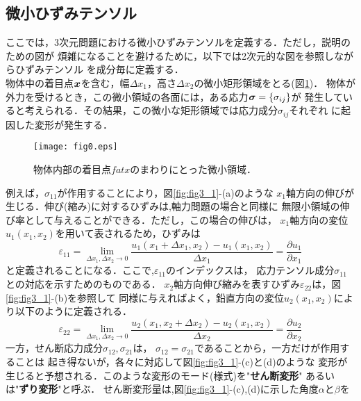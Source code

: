 \documentclass[10pt,a4j]{jarticle}
\begin{document}
\subsection{微小ひずみテンソル}
ここでは，3次元問題における微小ひずみテンソルを定義する．ただし，説明のための図が
煩雑になることを避けるために，以下では2次元的な図を参照しながらひずみテンソル
を成分毎に定義する．\\

物体中の着目点$\mbox{\boldmath $x$}$を含む，幅$\Delta x_1$，高さ$\Delta x_2$の微小矩形領域をとる(図\ref{fig:fig0})．
物体が外力を受けるとき，この微小領域の各面には，ある応力$\mbox{\boldmath $\sigma$}=\{\sigma_{ij}\}$が
発生していると考えられる．その結果，この微小な矩形領域では応力成分$\sigma_{ij}$それぞれ
に起因した変形が発生する．
\begin{figure}[h]
	\begin{center}
	\texttt{[image: fig0.eps]} 
	\end{center}
	\caption{物体内部の着目点$fat{x}$のまわりにとった微小領域．} 
	\label{fig:fig0}
\end{figure}
例えば，$\sigma_{11}$が作用することにより，図\ref{fig:fig3_1}-(a)のような
$x_1$軸方向の伸びが生じる．伸び(縮み)に対するひずみは,軸力問題の場合と同様に
無限小領域の伸び率として与えることができる．ただし，この場合の伸びは，
$x_1$軸方向の変位$u_1(x_1,x_2)$を用いて表されるため，ひずみは
\begin{equation}
	\varepsilon_{11}=\lim_{\Delta x_1,\Delta x_2 \rightarrow 0}
	\frac{u_1(x_1+\Delta x_1,x_2)-u_1(x_1,x_2)}{\Delta x_1}
	=\frac{\partial u_1}{\partial x_1}
	\label{eqn:def_e11}
\end{equation}
と定義されることになる．ここで,$\varepsilon_{11}$のインデックスは，
応力テンソル成分$\sigma_{11}$との対応を示すためのものである．
$x_2$軸方向伸び縮みを表すひずみ$\varepsilon_{22}$は，図\ref{fig:fig3_1}-(b)を参照して
同様に与えればよく，鉛直方向の変位$u_2(x_1,x_2)$により以下のように定義される．
\begin{equation}
	\varepsilon_{22}=\lim_{\Delta x_1,\Delta x_2 \rightarrow 0}
	\frac{u_2(x_1,x_2+\Delta x_2)-u_2(x_1,x_2)}{\Delta x_2}
	=\frac{\partial u_2}{\partial x_2}
	\label{eqn:def_e22}
\end{equation}
一方，せん断応力成分$\sigma_{12}, \sigma_{21}$は，
$\sigma_{12}=\sigma_{21}$であることから，一方だけが作用することは
起き得ないが，各々に対応して図\ref{fig:fig3_1}-(c)と(d)のような
変形が生じると予想される．このような変形のモード(様式)を"{\bf せん断変形}"
あるいは"{\bf ずり変形}"と呼ぶ．
せん断変形量は,図\ref{fig:fig3_1}-(c),(d)に示した角度$\alpha$と$\beta$を
\end{document}
